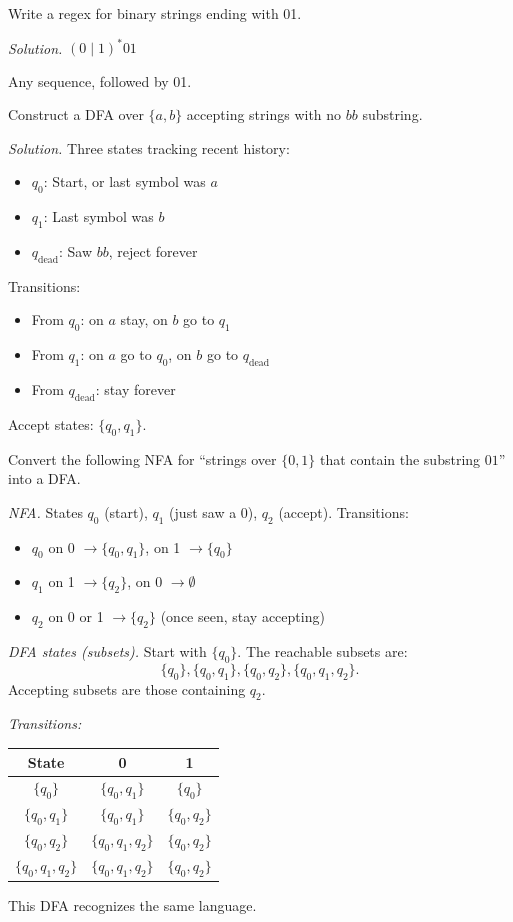 \begin{example}
Write a regex for binary strings ending with 01.

\emph{Solution.} $(0 \mid 1)^*01$

Any sequence, followed by 01.
\end{example}

\begin{example}
Construct a DFA over $\{a, b\}$ accepting strings with no $bb$ substring.

\emph{Solution.} Three states tracking recent history:
\begin{itemize}
  \item $q_0$: Start, or last symbol was $a$
  \item $q_1$: Last symbol was $b$
  \item $q_{\text{dead}}$: Saw $bb$, reject forever
\end{itemize}

Transitions:
\begin{itemize}
  \item From $q_0$: on $a$ stay, on $b$ go to $q_1$
  \item From $q_1$: on $a$ go to $q_0$, on $b$ go to $q_{\text{dead}}$
  \item From $q_{\text{dead}}$: stay forever
\end{itemize}
Accept states: $\{q_0, q_1\}$.
\end{example}

\begin{example}
Convert the following NFA for ``strings over $\{0,1\}$ that contain the substring $01$'' into a DFA.

\emph{NFA.} States $q_0$ (start), $q_1$ (just saw a 0), $q_2$ (accept). Transitions:
\begin{itemize}
  \item $q_0$ on 0 $\to \{q_0, q_1\}$, on 1 $\to \{q_0\}$
  \item $q_1$ on 1 $\to \{q_2\}$, on 0 $\to \emptyset$
  \item $q_2$ on 0 or 1 $\to \{q_2\}$ (once seen, stay accepting)
\end{itemize}

\emph{DFA states (subsets).} Start with $\{q_0\}$. The reachable subsets are:
\[
\{q_0\}, \{q_0,q_1\}, \{q_0,q_2\}, \{q_0,q_1,q_2\}.
\]
Accepting subsets are those containing $q_2$.

\emph{Transitions:}
\begin{center}
\begin{tabular}{c|cc}
State & 0 & 1 \\
\hline
$\{q_0\}$ & $\{q_0,q_1\}$ & $\{q_0\}$ \\
$\{q_0,q_1\}$ & $\{q_0,q_1\}$ & $\{q_0,q_2\}$ \\
$\{q_0,q_2\}$ & $\{q_0,q_1,q_2\}$ & $\{q_0,q_2\}$ \\
$\{q_0,q_1,q_2\}$ & $\{q_0,q_1,q_2\}$ & $\{q_0,q_2\}$
\end{tabular}
\end{center}
This DFA recognizes the same language.
\end{example}

